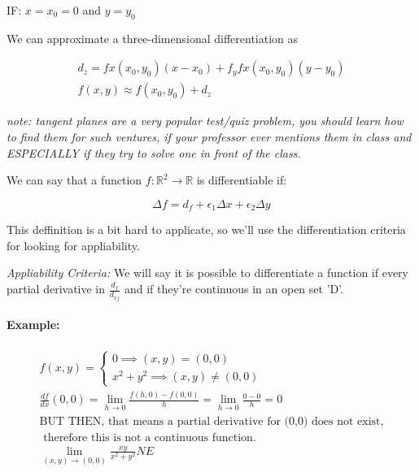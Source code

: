 \documentclass[11pt,fleqn]{book} %
\begin{document}
IF: $ x = x_0 = 0 $ and $ y = y_0$

We can approximate a three-dimensional differentiation as 

\begin{gather}
    d_z = fx(x_0, y_0)(x - x_0) + f_yfx(x_0, y_0)(y - y_0)\\
    f(x,y) \approx f(x_0, y_0) + d_z
\end{gather}

\textit{note: tangent planes are a very popular test/quiz problem, you should
learn how to find them for such ventures, if your professor ever mentions them
in class and ESPECIALLY if they try to solve one in front of the class.}

We can say that a function $ f: \mathbb{R}^2 \to \mathbb{R} $ is differentiable if:

\begin{equation}
    \Delta f = d_f + \epsilon_1 \Delta x +\epsilon_2 \Delta y 
\end{equation}

\noindent This deffinition is a bit hard to applicate, so we'll use the differentiation criteria for 
looking for appliability.

\textit{Appliability Criteria: }
We will say it is possible to differentiate a function if every partial derivative in $\frac{d_f}{d_{xj}}$
and if they're continuous in an open set 'D'.

\paragraph*{Example:}
\begin{gather}
    f(x,y) = \begin{cases}
        0 \implies (x, y) = (0,0) \\
        x^2 + y^2 \implies (x,y) \neq (0,0)
    \end{cases} \\
    \frac{df}{dx} (0,0)= \lim_{h \to 0}  \frac{f(h, 0) - f(0,0)}{h} = \lim_{h \to 0}  \frac{0 - 0}{h} = 0 \\
    \text{BUT THEN, that means a partial derivative for (0,0) does not exist,}\\ \text{ therefore this is not a continuous function.} \\
    \lim_{(x,y) \to (0,0)}  \frac{xy}{x^2+y^2} NE
\end{gather}
\end{document}
